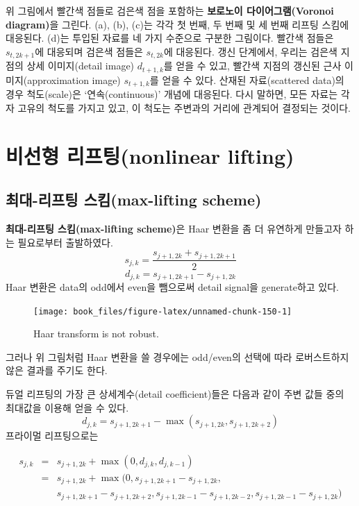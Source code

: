 \documentclass[b5paper,]{book}
\theoremstyle{definition}
\theoremstyle{definition}
\theoremstyle{definition}
\theoremstyle{remark}
\begin{document}
위 그림에서 빨간색 점들로 검은색 점을 포함하는 \textbf{보로노이
다이어그램(Voronoi diagram)}을 그린다. (a), (b), (c)는 각각 첫 번째, 두
번째 및 세 번째 리프팅 스킴에 대응된다. (d)는 투입된 자료를 네 가지
수준으로 구분한 그림이다. 빨간색 점들은 \(s_{t,2k+1}\)에 대응되며 검은색
점들은 \(s_{t,2k}\)에 대응된다. 갱신 단계에서, 우리는 검은색 지점의 상세
이미지(detail image) \(d_{t+1,k}\)를 얻을 수 있고, 빨간색 지점의 갱신된
근사 이미지(approximation image) \(s_{t+1,k}\)를 얻을 수 있다. 산재된
자료(scattered data)의 경우 척도(scale)은 `연속(continuous)' 개념에
대응된다. 다시 말하면, 모든 자료는 각자 고유의 척도를 가지고 있고, 이
척도는 주변과의 거리에 관계되어 결정되는 것이다.

\section{비선형 리프팅(nonlinear lifting)}\label{-nonlinear-lifting}

\subsection{최대-리프팅 스킴(max-lifting
scheme)}\label{--max-lifting-scheme}

\textbf{최대-리프팅 스킴(max-lifting scheme)}은 Haar 변환을 좀 더
유연하게 만들고자 하는 필요로부터 출발하였다.
\[s_{j,k}=\frac{s_{j+1,2k}+s_{j+1,2k+1}}{2}\]
\[d_{j,k}=s_{j+1,2k+1}-s_{j+1,2k}\] Haar 변환은 data의 odd에서 even을
뺌으로써 detail signal을 generate하고 있다.

\begin{figure}

{\centering \texttt{[image: book\_files/figure-latex/unnamed-chunk-150-1]} 

}

\caption{Haar transform is not robust.}\label{fig:unnamed-chunk-150}
\end{figure}

그러나 위 그림처럼 Haar 변환을 쓸 경우에는 odd/even의 선택에 따라
로버스트하지 않은 결과를 주기도 한다.

듀얼 리프팅의 가장 큰 상세계수(detail coefficient)들은 다음과 같이 주변
값들 중의 최대값을 이용해 얻을 수 있다.
\[d_{j,k}=s_{j+1,2k+1}-\max(s_{j+1,2k},s_{j+1,2k+2})\] 프라이멀
리프팅으로는

\begin{eqnarray*}
s_{j,k}&=& s_{j+1,2k}+\max (0,d_{j,k},d_{j,k-1})\\
&=&s_{j+1,2k}+\max (0, s_{j+1,2k+1}-s_{j+1,2k}, \\
& &s_{j+1,2k+1}-s_{j+1,2k+2}, s_{j+1,2k-1}-s_{j+1,2k-2}, s_{j+1,2k-1}-s_{j+1,2k})
\end{eqnarray*}
\end{document}
